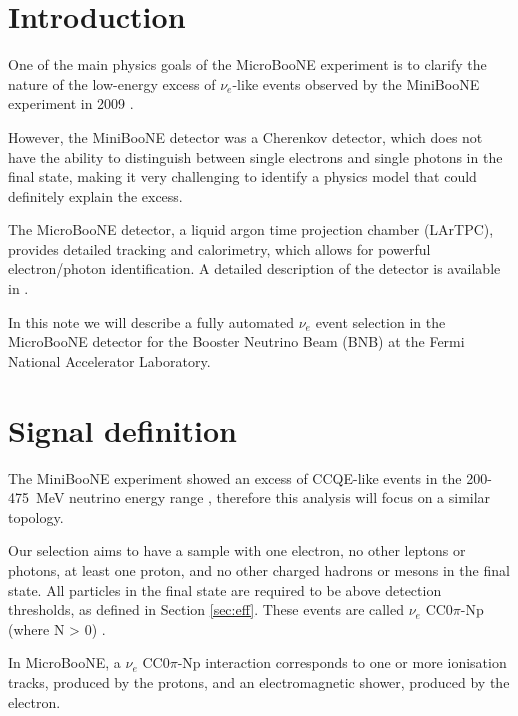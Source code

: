 \section{Introduction}
One of the main physics goals of the MicroBooNE experiment is to clarify the nature of the low-energy excess of $\nu_{e}$-like events observed by the MiniBooNE experiment in 2009 \cite{miniboone}. 

However, the MiniBooNE detector was a Cherenkov detector, which does not have the ability to distinguish between single electrons and single photons in the final state, making it very challenging to identify a physics model that  could definitely explain the excess.

The MicroBooNE detector, a liquid argon time projection chamber (LArTPC), provides detailed tracking and calorimetry, which allows for powerful electron/photon identification. A detailed description of the detector is available in \cite{detector}.

In this note we will describe a fully automated $\nu_{e}$ event selection in the MicroBooNE detector for the Booster Neutrino Beam (BNB) at the Fermi National Accelerator Laboratory.

\section{Signal definition}
The MiniBooNE experiment showed an excess of CCQE-like events in the 200-475~MeV neutrino energy range \cite{miniboone}, therefore this analysis will focus on a similar topology.

Our selection aims to have a sample with one electron, no other leptons or photons, at least one proton, and no other charged hadrons or mesons in the final state. All particles in the final state are required to be above detection thresholds, as defined in Section \ref{sec:eff}. These events are called $\nu_{e}$ CC0$\pi$-Np (where N > 0) \cite{teppei}.

In MicroBooNE, a $\nu_{e}$ CC0$\pi$-Np interaction corresponds to one or more ionisation tracks, produced by the protons, and an electromagnetic shower, produced by the electron. 
